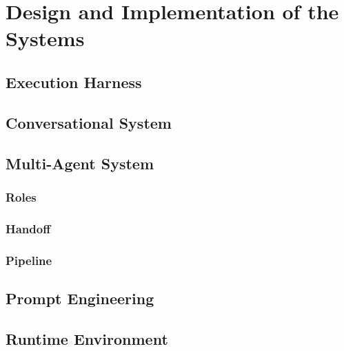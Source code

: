 \chapter{Design and Implementation of the Systems}
\label{chap:implementation}

\section{Execution Harness}
\label{sec:harness}

\section{Conversational System}
\label{sec:conversational-system}

\section{Multi-Agent System}
\label{sec:multi-agent-system}

\subsection{Roles}
\label{subsec:agent-roles}

\subsection{Handoff}
\label{subsec:agent-handoff}

\subsection{Pipeline}
\label{subsec:agent-pipeline}

\section{Prompt Engineering}
\label{sec:prompt-engineering}

\section{Runtime Environment}
\label{sec:runtime-environment}
